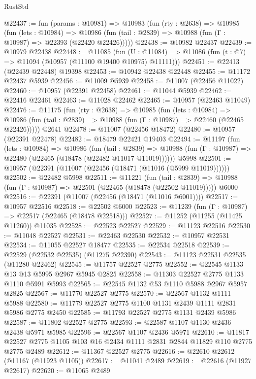 \begin{lexlean}{RustStd}
\begin{coremodule}
@22437 := fun (params : @10981) =>
  @10983
    (fun (rty : @2638) =>
    @10985
      (fun (lets : @10984) =>
      @10986 (fun (tail : @2839) => @10988 (fun (Γ : @10987) => @22393 (@22420 @22426)))))
@22438 := @10982 @22437
@22439 := @10979 @22438
@22448 := @11085
    (fun (U : @11084) => @11086 (fun (t : @7) => @11094 (@10957 (@11100 @19400 @10975) @11111)))
@22451 := @22413 (@22439 @22448) @19398
@22453 := @10942 @22438 @22448
@22455 := @11172 @22437 @5939
@22456 := @11009 @5939
@22458 := @11007 (@22456 @11022)
@22460 := @10957 (@22391 @22458)
@22461 := @11044 @5939
@22462 := @22416 @22461
@22463 := @11028 @22462
@22465 := @10957 (@22463 @11049)
@22476 := @11175
    (fun (rty : @2638) =>
    @10985
      (fun (lets : @10984) =>
      @10986 (fun (tail : @2839) => @10988 (fun (Γ : @10987) => @22460 (@22465 @22426)))))
    @2641
@22478 := @11007 (@22456 @18472)
@22480 := @10957 (@22391 @22478)
@22482 := @18479 @22421 @19403
@22494 := @11197
    (fun (lets : @10984) =>
    @10986
      (fun (tail : @2839) =>
      @10988 (fun (Γ : @10987) => @22480 (@22465 (@18478 (@22482 @11017 @11019))))))
    @5998
@22501 := @10957 (@22391 (@11007 (@22456 (@18471 (@11016 (@5999 @11019))))))
@22502 := @22482 @5998
@22511 := @11221
    (fun (tail : @2839) => @10988 (fun (Γ : @10987) => @22501 (@22465 (@18478 (@22502 @11019)))))
    @6000
@22516 := @22391 (@11007 (@22456 (@18471 (@11016 @6001))))
@22517 := @10957 @22516
@22518 := @22502 @6000
@22523 := @11239 (fun (Γ : @10987) => @22517 (@22465 (@18478 @22518)))
@22527 := @11252 (@11255 (@11425 @11260)) @11035
@22528 := @22523 @22527
@22529 := @11123 @22516
@22530 := @11048 @22527
@22531 := @22463 @22530
@22532 := @10957 @22531
@22534 := @11055 @22527 @18477
@22535 := @22534 @22518
@22539 := @22529 (@22532 @22535) (@11275 @22390)
@22543 := @11123 @22531 @22535 (@11280 @22462)
@22545 := @11757 @22527 @2775
@22552 := @22545 @1133 @13 @13 @5995 @2967 @5945 @2825
@22558 := @11303 @22527 @2775 @1133 @1110 @5991 @5993
@22565 := @22545 @1132 @53 @1110 @5988 @2967 @5957 @2825
@22567 := @11770 @22527 @2775
@22570 := @22567 @1132 @1111 @5988
@22580 := @11779 @22527 @2775 @1100 @1131 @2439 @1111 @2831 @5986 @2775 @2450
@22585 := @11793 @22527 @2775 @1131 @2439 @5986
@22587 := @11802 @22527 @2775
@22593 := @22587 @1107 @1130 @2436 @2438 @5971 @5985
@22596 := @22567 @1107 @2436 @5971
@22610 := @11817 @22527 @2775 @1105 @103 @16 @2434 @1111 @2831 @2844 @11829 @110 @2775 @2775 @2489
@22612 := @11367 @22527 @2775
@22616 := @22610 @22612 (@11167 (@11923 @1105))
@22617 := @11041 @2489
@22619 := @22616 (@11927 @22617)
@22620 := @11065 @2489

\end{coremodule}
\end{lexlean}
